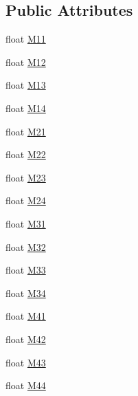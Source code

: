 \subsection*{Public Attributes}
\begin{DoxyCompactItemize}
\item 
float \hyperlink{struct_microsoft_1_1_xna_1_1_framework_1_1_matrix_a0b1812bcca862dcbccd0f14c4322fc9b}{M11}
\item 
float \hyperlink{struct_microsoft_1_1_xna_1_1_framework_1_1_matrix_a4e9b49687081c230a84634747e365db0}{M12}
\item 
float \hyperlink{struct_microsoft_1_1_xna_1_1_framework_1_1_matrix_ab25338521daff482d87e6ebb9f67bbd4}{M13}
\item 
float \hyperlink{struct_microsoft_1_1_xna_1_1_framework_1_1_matrix_ae00f70a0170bbf9c8a3f7735fb061fdf}{M14}
\item 
float \hyperlink{struct_microsoft_1_1_xna_1_1_framework_1_1_matrix_a8adb2b0115cdfa37f55a8370af608003}{M21}
\item 
float \hyperlink{struct_microsoft_1_1_xna_1_1_framework_1_1_matrix_a41c8180a3b1a80493d76948105a9cd02}{M22}
\item 
float \hyperlink{struct_microsoft_1_1_xna_1_1_framework_1_1_matrix_a062ed0d8d2d40a361b7ff745adec0e6e}{M23}
\item 
float \hyperlink{struct_microsoft_1_1_xna_1_1_framework_1_1_matrix_aa697ea97b7bc462c48d6e574a8dc86bf}{M24}
\item 
float \hyperlink{struct_microsoft_1_1_xna_1_1_framework_1_1_matrix_a1844dbe90fee72472bb6d2134bd3eb92}{M31}
\item 
float \hyperlink{struct_microsoft_1_1_xna_1_1_framework_1_1_matrix_ac830021da1e6a835ade8b63fd1dcc3c0}{M32}
\item 
float \hyperlink{struct_microsoft_1_1_xna_1_1_framework_1_1_matrix_a2c36c4a0be406f0c2144e885894fc458}{M33}
\item 
float \hyperlink{struct_microsoft_1_1_xna_1_1_framework_1_1_matrix_a85164870b4c68d01a399775bd71f106c}{M34}
\item 
float \hyperlink{struct_microsoft_1_1_xna_1_1_framework_1_1_matrix_a3a55fd9d5230de4fa2fc00399210874c}{M41}
\item 
float \hyperlink{struct_microsoft_1_1_xna_1_1_framework_1_1_matrix_a0c458086cf20402a2dc96c3edbb8a74c}{M42}
\item 
float \hyperlink{struct_microsoft_1_1_xna_1_1_framework_1_1_matrix_abe32dc08377b955cded371139acb5739}{M43}
\item 
float \hyperlink{struct_microsoft_1_1_xna_1_1_framework_1_1_matrix_aef258b07d40e07879d313b4db48a4628}{M44}
\end{DoxyCompactItemize}
